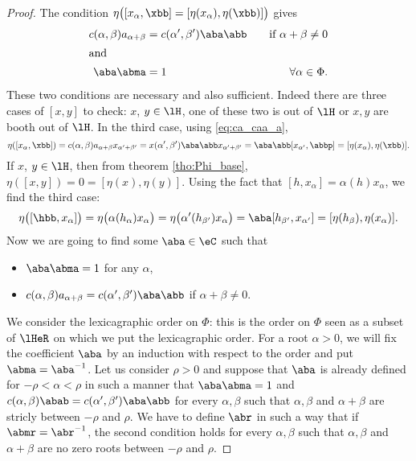 \begin{proof}
The condition $\eta\big(  [ x_{\alpha},\xbb]=[\eta( x_{\alpha}),\eta(\xbb)]  \big)$ gives
\begin{subequations}
\begin{align}
\label{eq:ca_caa_a}
c(\alpha,\beta)a_{\alpha+\beta}&=c(\alpha',\beta')\aba\abb&\quad\text{if $\alpha+\beta\neq 0$}\\
\intertext{and}  
\label{eq:ca_caa_b}
\aba\abma &=1                        &\quad\forall\alpha\in\Phi.
\end{align}
\end{subequations}
These two conditions are necessary and also sufficient. Indeed there are three cases of $[x,y]$ to check: $x$, $y\in\lH$, one of these two is out of $\lH$ or $x,y$ are booth out of $\lH$. In the third case, using \eqref{eq:ca_caa_a},
\begin{equation}
\eta([ x_{\alpha},\xbb])=c(\alpha,\beta)a_{\alpha+\beta}x_{\alpha'+\beta'}
            =x(\alpha',\beta')\aba\abb x_{\alpha'+\beta'}
            =\aba\abb[x_{\alpha'},\abbp]
            =[\eta( x_{\alpha}),\eta(\xbb)].
\end{equation}
If $x$, $y\in\lH$, then from theorem \ref{tho:Phi_base}, $\eta([x,y])=0=[\eta(x),\eta(y)]$. Using the fact that $[h, x_{\alpha}]=\alpha(h) x_{\alpha}$, we find the third case:
\begin{equation}
\eta\big(  [\hbb, x_{\alpha}]  \big)=\eta\big(  \alpha( h_{\alpha}) x_{\alpha}  \big)
                =\eta\big(  \alpha'(h_{\beta'}) x_{\alpha}  \big)
                =\aba[h_{\beta'},x_{\alpha'}]
                =[\eta(h_{\beta}),\eta( x_{\alpha})].
\end{equation}
Now we are going to find some $\aba\in\eC$ such that
\begin{itemize}
\item $\aba\abma=1$ for any $\alpha$,
\item $c(\alpha,\beta)a_{\alpha+\beta}=c(\alpha',\beta')\aba\abb$ if $\alpha+\beta\neq 0$.  
\end{itemize}
We consider the lexicagraphic order  on $\Phi$: this is the order on $\Phi$ seen as a subset of $\lHeR$ on which we put the lexicagraphic order. For a root $\alpha>0$, we will fix the coefficient $\aba$ by an induction with respect to the order and put $\abma=\aba^{-1}$. Let us consider $\rho>0$ and suppose that $\aba$ is already defined for $-\rho<\alpha<\rho$ in such a manner that $\aba\abma=1$ and $c(\alpha,\beta)\abab=c(\alpha',\beta')\aba\abb$ for every $\alpha,\beta$ such that $\alpha,\beta$ and $\alpha+\beta$ are stricly between $-\rho$ and $\rho$. We have to define $\abr$ in such a way that if $\abmr=\abr^{-1}$, the second condition holds for every $\alpha,\beta$ such that $\alpha,\beta$ and $\alpha+\beta$ are no zero roots between $-\rho$ and $\rho$.


\end{proof}
